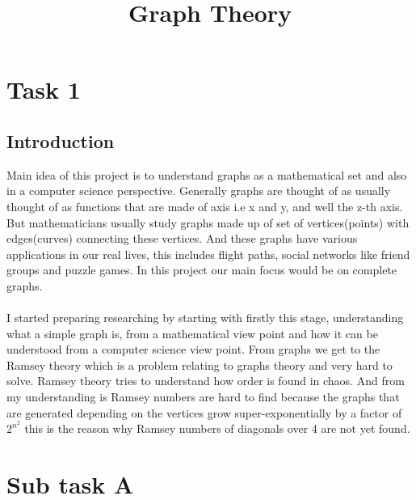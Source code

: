 \documentclass{Assignment}
\title{Graph Theory}
\begin{document}
\section*{Task 1}
\subsection*{Introduction}
Main idea of this project is to understand graphs  as a mathematical set and also in a computer science perspective. 
Generally graphs are thought of as usually thought of as functions that are made of axis i.e x and y, and well the z-th axis.
But mathematicians usually study graphs made up of set of vertices(points) with edges(curves) connecting these vertices.
And these graphs have various applications in our real lives, this includes flight paths, social networks like friend groups and puzzle games. 
In this project our main focus would be on complete graphs.\\
\\
 I started preparing researching by starting with firstly this stage, understanding what a simple graph is, from a mathematical view point and how it can be understood from a computer science view point.
  From graphs we get to the Ramsey theory which is a problem relating to graphs theory and very hard to solve.
   Ramsey theory tries to understand how order is found in chaos. 
   And from my understanding is Ramsey numbers are hard to find because the graphs that are generated depending on the vertices grow super-exponentially by a factor of $2^{n^2}$ this is the reason why Ramsey numbers of diagonals over 4 are not yet found.\\
  
\section*{Sub task A}
\end{document}
